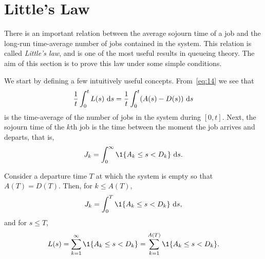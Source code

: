 



\section{Little's Law}
\label{sec:littles-law}

There is an important relation between the average sojourn time of a job and the long-run time-average number of jobs contained in the system.
This relation is called \emph{Little's law}, and is one of the most useful results in queueing theory.
The aim of this section is to prove this law under some simple conditions.


We start by defining a few intuitively useful concepts. From~\cref{eq:14} we see that
\begin{equation*}
\frac 1 t\int_0^t L(s)\, \,\textrm{d}s = \frac 1 t\int_0^t (A(s)-D(s)) \, \,\textrm{d}s
\end{equation*}
is the time-average of the number of jobs in the system during
$[0,t]$.
Next,
the sojourn time of the $k$th job is the time between the moment the job arrives and departs, that is,
\begin{equation*}
 \J_k = \int_0^\infty \1{A_k \leq s < D_k}\,\d s.
\end{equation*}

Consider a departure time $T$ at which the system is empty so that $A(T) = D(T)$.
Then, for $k\leq A(T)$, 
\begin{equation*}
 \J_k = \int_0^T \1{A_k \leq s < D_k}\,\d s,
\end{equation*}
and for $s\leq T$,
\begin{equation*}
\L(s) = \sum_{k=1}^\infty \1{A_k \leq s < D_k} = \sum_{k=1}^{A(T)}\1{A_k \leq s < D_k}.
\end{equation*}

